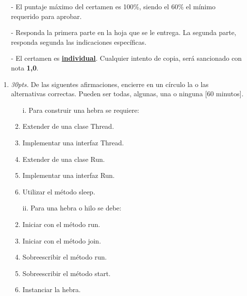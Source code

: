 \documentclass[10pt]{article}
\begin{document}
{\scriptsize
\begin{itemize}
    \item[-] El puntaje m\'aximo del certamen es 100\%, siendo el 60\% el m\'inimo requerido para aprobar.
    \item[-] Responda la primera parte en la hoja que se le entrega. La segunda parte, responda segunda las indicaciones espec\'ificas.
    \item[-] El certamen es \underline{\textbf{individual}}. Cualquier intento de copia, ser\'a sancionado con nota \textbf{1,0}.
\end{itemize}
\vspace*{10pt}

\vspace*{-30pt}

\begin{enumerate}

    \item \emph{30pts.} De las siguentes afirmaciones, encierre en un c\'irculo la o las alternativas correctas. Pueden ser todas, algunas, una o ninguna [60 minutos].
    \begin{multicols}{2}

    \begin{enumerate}[label=(\alph*)]
        \item[i.] Para construir una hebra se requiere:
        \item Extender de una clase Thread.
        \item Implementar una interfaz Thread.
        \item Extender de una clase Run.
        \item Implementar una interfaz Run.
        \item Utilizar el m\'etodo sleep. 
    \end{enumerate}

    \begin{enumerate}[label=(\alph*)]
        \item[ii.] Para una hebra o hilo se debe:
        \item Iniciar con el m\'etodo run.
        \item Iniciar con el m\'etodo join.
        \item Sobreescribir el m\'etodo run.
        \item Sobreescribir el m\'etodo start.
        \item Instanciar la hebra.
    \end{enumerate}


\end{multicols}
\end{enumerate}}
\end{document}
